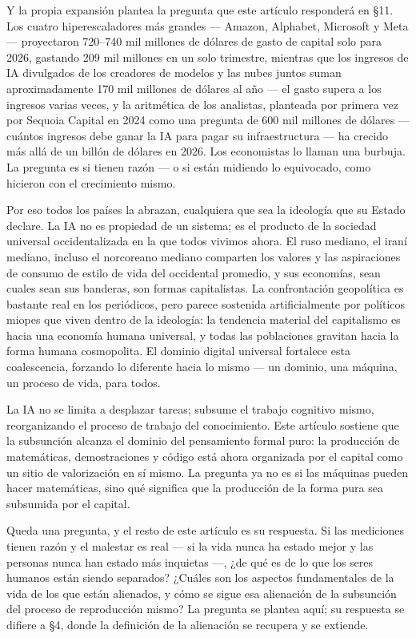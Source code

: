 \documentclass[11pt]{article}
\begin{document}
Y la propia expansión plantea la pregunta que este artículo responderá
en §11. Los cuatro hiperescaladores más grandes --- Amazon, Alphabet,
Microsoft y Meta --- proyectaron 720--740 mil millones de dólares de
gasto de capital solo para 2026, gastando 209 mil millones en un solo
trimestre, mientras que los ingresos de IA divulgados de los creadores
de modelos y las nubes juntos suman aproximadamente 170 mil millones de
dólares al año --- el gasto supera a los ingresos varias veces, y la
aritmética de los analistas, planteada por primera vez por Sequoia
Capital en 2024 como una pregunta de 600 mil millones de dólares ---
cuántos ingresos debe ganar la IA para pagar su infraestructura --- ha
crecido más allá de un billón de dólares en 2026. Los economistas lo
llaman una burbuja. La pregunta es si tienen razón --- o si están
midiendo lo equivocado, como hicieron con el crecimiento mismo.

Por eso todos los países la abrazan, cualquiera que sea la ideología
que su Estado declare. La IA no es propiedad de un sistema; es el
producto de la sociedad universal occidentalizada en la que todos
vivimos ahora. El ruso mediano, el iraní mediano, incluso el norcoreano
mediano comparten los valores y las aspiraciones de consumo de estilo
de vida del occidental promedio, y sus economías, sean cuales sean sus
banderas, son formas capitalistas. La confrontación geopolítica es
bastante real en los periódicos, pero parece sostenida artificialmente
por políticos miopes que viven dentro de la ideología: la tendencia
material del capitalismo es hacia una economía humana universal, y todas
las poblaciones gravitan hacia la forma humana cosmopolita. El dominio
digital universal fortalece esta coalescencia, forzando lo diferente
hacia lo mismo --- un dominio, una máquina, un proceso de vida, para
todos.

La IA no se limita a desplazar tareas; subsume el trabajo cognitivo
mismo, reorganizando el proceso de trabajo del conocimiento. Este
artículo sostiene que la subsunción alcanza el dominio del pensamiento
formal puro: la producción de matemáticas, demostraciones y código está
ahora organizada por el capital como un sitio de valorización en sí
mismo. La pregunta ya no es si las máquinas pueden hacer matemáticas,
sino qué significa que la producción de la forma pura sea subsumida por
el capital.

Queda una pregunta, y el resto de este artículo es su respuesta. Si las
mediciones tienen razón y el malestar es real --- si la vida nunca ha
estado mejor y las personas nunca han estado más inquietas ---, ¿de qué
es de lo que los seres humanos están siendo separados? ¿Cuáles son los
aspectos fundamentales de la vida de los que están alienados, y cómo se
sigue esa alienación de la subsunción del proceso de reproducción mismo?
La pregunta se plantea aquí; su respuesta se difiere a §4, donde la
definición de la alienación se recupera y se extiende.
\end{document}
